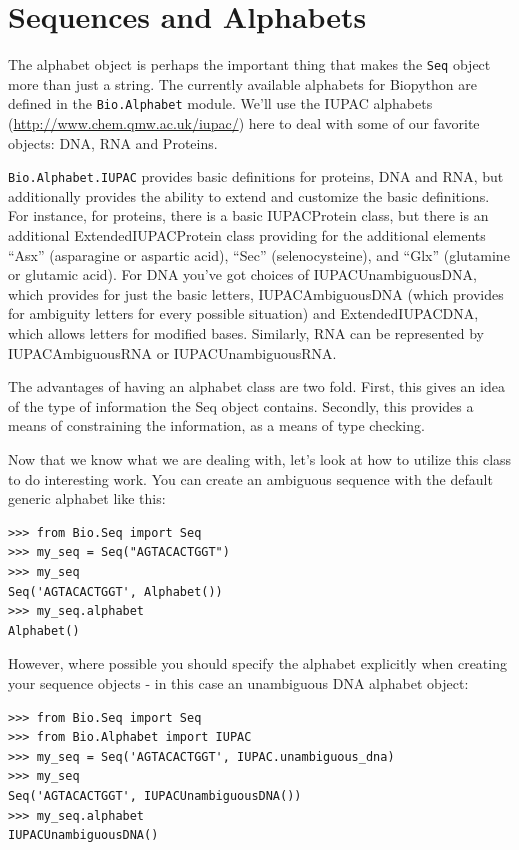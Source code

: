 \documentclass{report}
\begin{document}
\section{Sequences and Alphabets}

The alphabet object is perhaps the important thing that makes the \verb|Seq| object more than just a string. The currently available alphabets for Biopython are defined in the \verb|Bio.Alphabet| module. We'll use the IUPAC alphabets (\url{http://www.chem.qmw.ac.uk/iupac/}) here to deal with some of our favorite objects: DNA, RNA and Proteins.

\verb|Bio.Alphabet.IUPAC| provides basic definitions for proteins, DNA and RNA, but additionally provides the ability to extend and customize the basic definitions. For instance, for proteins, there is a basic IUPACProtein class, but there is an additional ExtendedIUPACProtein class providing for the additional elements ``Asx'' (asparagine or aspartic acid), ``Sec'' (selenocysteine), and ``Glx'' (glutamine or glutamic acid). For DNA you've got choices of IUPACUnambiguousDNA, which provides for just the basic letters, IUPACAmbiguousDNA (which provides for ambiguity letters for every possible situation) and ExtendedIUPACDNA, which allows letters for modified bases. Similarly, RNA can be represented by IUPACAmbiguousRNA or IUPACUnambiguousRNA.

The advantages of having an alphabet class are two fold. First, this gives an idea of the type of information the Seq object contains. Secondly, this provides a means of constraining the information, as a means of type checking.

Now that we know what we are dealing with, let's look at how to utilize this class to do interesting work.
You can create an ambiguous sequence with the default generic alphabet like this:

\begin{verbatim}
>>> from Bio.Seq import Seq
>>> my_seq = Seq("AGTACACTGGT")
>>> my_seq
Seq('AGTACACTGGT', Alphabet())
>>> my_seq.alphabet
Alphabet()
\end{verbatim}

However, where possible you should specify the alphabet explicitly when creating your sequence objects - in this case an unambiguous DNA alphabet object:

\begin{verbatim}
>>> from Bio.Seq import Seq
>>> from Bio.Alphabet import IUPAC
>>> my_seq = Seq('AGTACACTGGT', IUPAC.unambiguous_dna)
>>> my_seq
Seq('AGTACACTGGT', IUPACUnambiguousDNA())
>>> my_seq.alphabet
IUPACUnambiguousDNA()
\end{verbatim}
\end{document}
